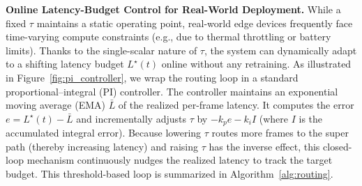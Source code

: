 \textbf{Online Latency-Budget Control for Real-World Deployment.}
While a fixed $\tau$ maintains a static operating point, real-world edge devices frequently face time-varying compute constraints (e.g., due to thermal throttling or battery limits). 
Thanks to the single-scalar nature of $\tau$, the system can dynamically adapt to a shifting latency budget $L^\star(t)$ online without any retraining. 
As illustrated in Figure~\ref{fig:pi_controller}, we wrap the routing loop in a standard proportional--integral (PI) controller. 
The controller maintains an exponential moving average (EMA) $\bar{L}$ of the realized per-frame latency. 
It computes the error $e = L^\star(t) - \bar{L}$ and incrementally adjusts $\tau$ by $-k_p e - k_i I$ (where $I$ is the accumulated integral error). 
Because lowering $\tau$ routes more frames to the super path (thereby increasing latency) and raising $\tau$ has the inverse effect, this closed-loop mechanism continuously nudges the realized latency to track the target budget. 
This threshold-based loop is summarized in Algorithm~\ref{alg:routing}.


